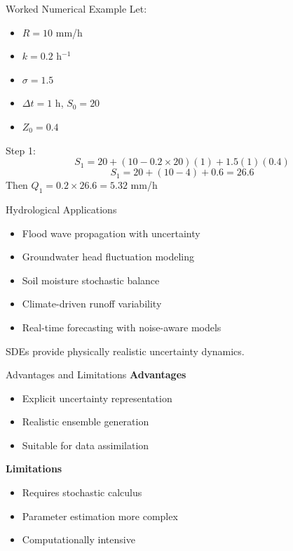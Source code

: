 \documentclass[8pt]{beamer}
\begin{document}
\begin{frame}{Worked Numerical Example}
Let:
\begin{itemize}
 \item $R=10$ mm/h
 \item $k=0.2$ h$^{-1}$
 \item $\sigma=1.5$
 \item $\Delta t=1$ h, $S_0=20$
 \item $Z_0=0.4$
\end{itemize}

Step 1:
\[
S_1 = 20 + (10 - 0.2\times20)(1) + 1.5(1)(0.4)
\]
\[
S_1 = 20 + (10 - 4) + 0.6 = 26.6
\]
Then $Q_1 = 0.2 \times 26.6 = 5.32$ mm/h
\end{frame}

\begin{frame}{Hydrological Applications}
\begin{itemize}
 \item Flood wave propagation with uncertainty
 \item Groundwater head fluctuation modeling
 \item Soil moisture stochastic balance
 \item Climate-driven runoff variability
 \item Real-time forecasting with noise-aware models
\end{itemize}

SDEs provide physically realistic uncertainty dynamics.
\end{frame}

\begin{frame}{Advantages and Limitations}
\textbf{Advantages}
\begin{itemize}
 \item Explicit uncertainty representation
 \item Realistic ensemble generation
 \item Suitable for data assimilation
\end{itemize}

\textbf{Limitations}
\begin{itemize}
 \item Requires stochastic calculus
 \item Parameter estimation more complex
 \item Computationally intensive
\end{itemize}
\end{frame}
\end{document}
